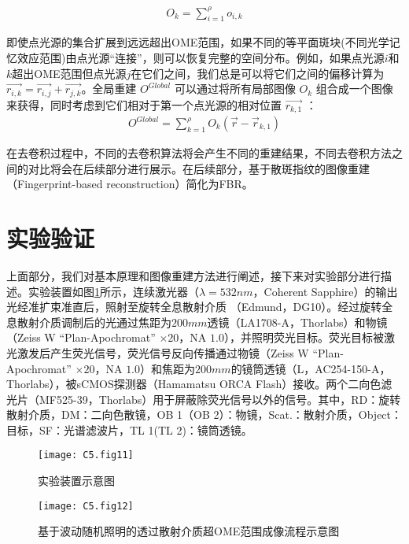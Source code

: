 \begin{equation}
		\begin{aligned}
O_{k} = \sum^{\rho}_{i=1}
o_{i,k}
\label{eq:5.5}
\end{aligned}
\end{equation}

即使点光源的集合扩展到远远超出OME范围，如果不同的等平面斑块(不同光学记忆效应范围)由点光源“连接”，则可以恢复完整的空间分布。例如，如果点光源$i$和$k$超出OME范围但点光源$j$在它们之间，我们总是可以将它们之间的偏移计算为 $\vec{r_{i,k}} = \vec {r_{i,j}} + \vec{r_{j,k}}$。全局重建 $O^{Global}$ 可以通过将所有局部图像 $O_{k}$ 组合成一个图像来获得，同时考虑到它们相对于第一个点光源的相对位置 $\vec{r_{k,1}}$ ：
\begin{equation}
	\begin{aligned}
O^{Global} = \sum^{\rho}_{k=1}
O_{k}(\overrightarrow{r} - \overrightarrow{r}_{k,1})
\label{eq:5.6}
\end{aligned}
\end{equation}

在去卷积过程中，不同的去卷积算法将会产生不同的重建结果，不同去卷积方法之间的对比将会在后续部分进行展示。在后续部分，基于散斑指纹的图像重建（Fingerprint-based reconstruction）简化为FBR。

\section{实验验证}

上面部分，我们对基本原理和图像重建方法进行阐述，接下来对实验部分进行描述。实验装置如图\ref{fig:5.11}所示，连续激光器（$\lambda  = 532 nm $，Coherent Sapphire）的输出光经准扩束准直后，照射至旋转全息散射介质 （Edmund，DG10）。经过旋转全息散射介质调制后的光通过焦距为$200 mm$透镜（LA1708-A，Thorlabs）和物镜（Zeiss W “Plan-Apochromat” $\times 20$，NA $1.0$），并照明荧光目标。荧光目标被激光激发后产生荧光信号，荧光信号反向传播通过物镜（Zeiss W “Plan-Apochromat” $\times 20$，NA $1.0$）和焦距为$200 mm$的镜筒透镜（L，AC254-150-A，Thorlabs），被sCMOS探测器（Hamamatsu ORCA Flash）接收。两个二向色滤光片（MF525-39，Thorlabs）用于屏蔽除荧光信号以外的信号。其中，RD：旋转散射介质，DM：二向色散镜，OB 1（OB 2）：物镜，Scat.：散射介质，Object：目标，SF：光谱滤波片，TL 1(TL 2)：镜筒透镜。

\begin{figure}[htp]
	\centering
	\texttt{[image: C5.fig11]}
	\caption{实验装置示意图}
	\label{fig:5.11}
\end{figure}

\begin{figure}[htp]
	\centering
	\texttt{[image: C5.fig12]}
	\caption{基于波动随机照明的透过散射介质超OME范围成像流程示意图}
	\label{fig:5.12}
\end{figure}

